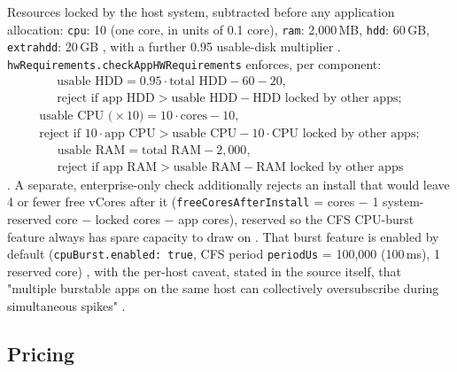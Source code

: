 Resources locked by the host system, subtracted before any application allocation:
\texttt{cpu}: 10 (one core, in units of 0.1 core), \texttt{ram}: 2{,}000\,MB, \texttt{hdd}: 60\,GB,
\texttt{extrahdd}: 20\,GB , with a further 0.95
usable-disk multiplier .
\texttt{hwRequirements.\allowbreak{}checkAppHWRequirements} enforces, per component:
\begin{multline*}
\text{usable HDD} = 0.95\cdot\text{total HDD} - 60 - 20, \\
\text{reject if } \text{app HDD} > \text{usable HDD} - \text{HDD locked by other apps};
\end{multline*}
\begin{multline*}
\text{usable CPU (}\times 10\text{)} = 10\cdot\text{cores} - 10, \\
\text{reject if } 10\cdot\text{app CPU} > \text{usable CPU} - 10\cdot\text{CPU locked by other apps};
\end{multline*}
\begin{multline*}
\text{usable RAM} = \text{total RAM} - 2{,}000, \\
\text{reject if app RAM} > \text{usable RAM} - \text{RAM locked by other apps}
\end{multline*}
. A separate,
enterprise-only check additionally rejects an install that would leave 4 or fewer free vCores after
it (\texttt{free\allowbreak{}Cores\allowbreak{}After\allowbreak{}Install} = cores $-$ 1 system-reserved core $-$ locked cores $-$ app
cores), reserved so the CFS CPU-burst feature always has spare capacity to draw on
. That burst feature
is enabled by default (\texttt{cpuBurst.\allowbreak{}enabled: true}, CFS period \texttt{periodUs} = 100{,}000
(100\,ms), 1 reserved core) , with the per-host
caveat, stated in the source itself, that "multiple burstable apps on the same host can
collectively oversubscribe during simultaneous spikes"
.

\subsection{Pricing}
\label{sec:fluxos-pricing}

